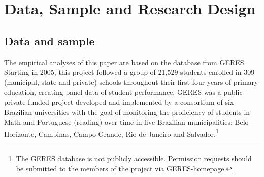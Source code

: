 \documentclass[a4paper, 12pt]{article}
\begin{document}













\section{Data, Sample and Research Design} \label{Paper3-Data}


\subsection{Data and sample} \label{Sample}

The empirical analyses of this paper are based on the database from GERES. Starting in 2005, this project followed a group of 21,529 students enrolled in 309 (municipal, state and private) schools throughout their first four years of primary education, creating panel data of student performance. GERES was a public-private-funded project developed and implemented by a consortium of six Brazilian universities with the goal of monitoring the proficiency of students in Math and Portuguese (reading) over time in five Brazilian municipalities: Belo Horizonte, Campinas, Campo Grande, Rio de Janeiro and Salvador.\footnote{The GERES database is not publicly accessible. Permission requests should be submitted to the members of the project via \href{https://laedpucrio.wordpress.com/projetos/o-projeto-geres/}{GERES-homepage}.}



\end{document}
